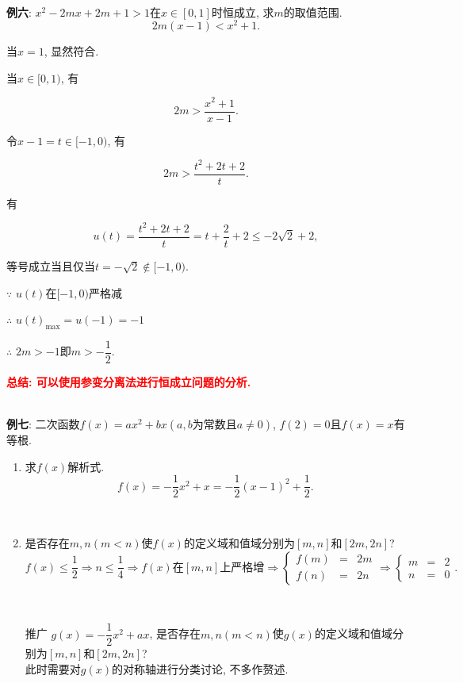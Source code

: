 \documentclass[8pt]{article}
\begin{document}
				~\\

				\textbf{例六}: $x^2-2mx+2m+1>1$在$x\in[0, 1]$时恒成立, 求$m$的取值范围.
					~\\

					$$2m(x-1)<x^2+1.$$

					当$x=1$, 显然符合.

					当$x\in [0, 1)$, 有

					$$2m>\frac{x^2+1}{x-1}.$$

					令$x-1=t\in[-1, 0)$, 有

					$$2m>\frac{t^2+2t+2}{t}.$$

					有

					$$u(t)=\frac{t^2+2t+2}{t}=t+\frac{2}{t}+2\leq -2\sqrt{2}+2,$$

					等号成立当且仅当$t=-\sqrt{2} \notin [-1, 0)$.

					$\because$ $u(t)$在$[-1, 0)$严格减

					$\therefore$ $u(t)_{\max}=u(-1)=-1$

					$\therefore$ $2m>-1$即$m>-\dfrac{1}{2}.$	

					\textbf{\textcolor{red}{总结: 可以使用参变分离法进行恒成立问题的分析.}}

				~\\

				\textbf{例七}: 二次函数$f(x)=ax^2+bx (a, b\text{为常数且}a\neq 0)$, $f(2)=0$且$f(x)=x$有等根.
					\begin{enumerate}[label=(\arabic*)]
						\item 求$f(x)$解析式.
							~\\

							$$f(x)=-\frac{1}{2} x^2 + x = -\frac{1}{2} (x-1)^2 + \frac{1}{2}.$$

							~\\

						\item 是否存在$m, n (m<n)$使$f(x)$的定义域和值域分别为$[m, n]$和$[2m, 2n]$?
							~\\

							$$f(x) \leq \frac{1}{2} \Rightarrow n\leq \frac{1}{4}\Rightarrow f(x)\text{在}[m, n]\text{上严格增} \Rightarrow \left\{\begin{array}{rcl}f(m)&=&2m\\f(n)&=&2n\end{array}\right. \Rightarrow \left\{\begin{array}{rcl}m&=&2\\n&=&0\end{array}\right..$$

							~\\

						\item [推广] $g(x)=-\dfrac{1}{2}x^2+ax$, 是否存在$m, n (m<n)$使$g(x)$的定义域和值域分别为$[m, n]$和$[2m, 2n]$?
							~\\

							此时需要对$g(x)$的对称轴进行分类讨论, 不多作赘述.
							
					\end{enumerate}
\end{document}
